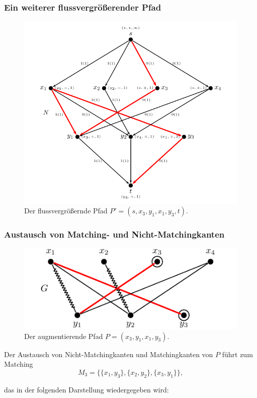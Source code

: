 \documentclass[smaller]{beamer}
\begin{document}
\begin{frame}
 \frametitle{Ein weiterer flussvergrößerender Pfad}
\begin{figure}[H]
\begin{center}
 \includegraphics[scale=0.72]{fig53.pdf}
\end{center}
\caption{Der flussvergrößernde Pfad $P'=(s,x_3,y_1,x_1,y_3,t)$.}
\label{abb:11:5}
\end{figure}
\end{frame}

\begin{frame}
\frametitle{Austausch von Matching- und Nicht-Matchingkanten}
\begin{figure}[H]
\begin{center}
 \includegraphics{fig54.pdf}
\end{center}
\caption{Der augmentierende Pfad $P=(x_3,y_1,x_1,y_3)$.}
\label{abb:11:6}
\end{figure}

Der Austausch von Nicht-Matchingkanten und Matchingkanten von $P$ führt zum Matching
\[
M_3 = \big\{ \{x_1,y_3\}, \{x_2,y_2\}, \{x_3,y_1\} \big\},
\]

das in der folgenden Darstellung wiedergegeben wird:
\end{frame}
\end{document}
